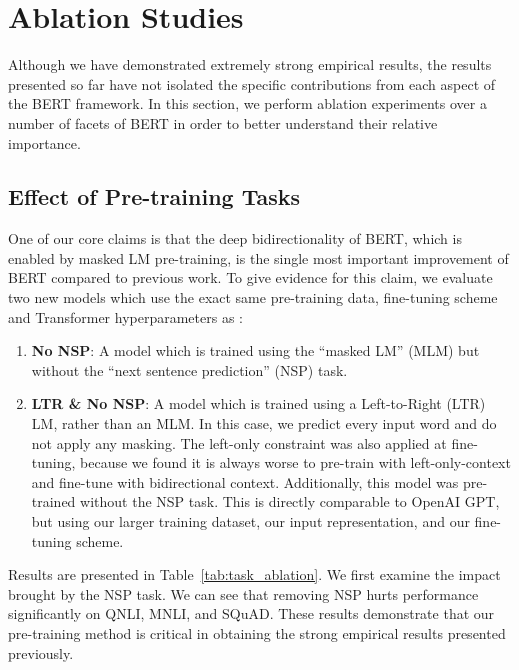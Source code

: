 \section{Ablation Studies}
\label{sec:ablation}

Although we have demonstrated extremely strong empirical results, the results presented so far have not isolated the specific contributions from each aspect of the BERT framework. In this section, we perform ablation experiments over a number of facets of BERT in order to better understand their relative importance.

\subsection{Effect of Pre-training Tasks}

\label{sec:task_ablation}
One of our core claims is that the deep bidirectionality of BERT, which is enabled by masked LM pre-training, is the single most important improvement of BERT compared to previous work. To give evidence for this claim, we evaluate two new models which use the exact same pre-training data, fine-tuning scheme and Transformer hyperparameters as \bertbase:

\begin{enumerate}
\item {\bf No NSP}: A model which is trained using the ``masked LM'' (MLM) but without the ``next sentence prediction'' (NSP) task.
\item {\bf LTR \& No NSP}: A model which is trained using a Left-to-Right (LTR) LM, rather than an MLM. In this case, we predict every input word and do not apply any masking. The left-only constraint was also applied at fine-tuning, because we found it is always worse to pre-train with left-only-context and fine-tune with bidirectional context. Additionally, this model was pre-trained without the NSP task. This is directly comparable to OpenAI GPT, but using our larger training dataset, our input representation, and our fine-tuning scheme.
\end{enumerate}




Results are presented in Table~\ref{tab:task_ablation}. We first examine the impact brought by the NSP task. We can see that removing NSP hurts performance significantly on QNLI, MNLI, and SQuAD. These results demonstrate that our pre-training method is critical in obtaining the strong empirical results presented previously.

